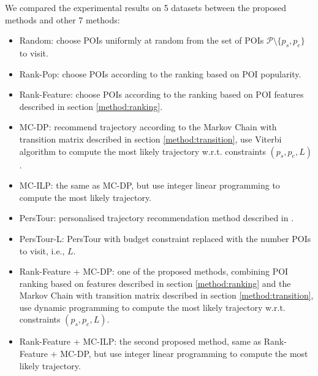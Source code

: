 \documentclass{sig-alternate-05-2015}
\begin{document}
We compared the experimental results on 5 datasets between the proposed methods and other 7 methods:
\begin{itemize}
\item Random: choose POIs uniformly at random from the set of POIs $\mathcal{P} \setminus \{p_s, p_e \}$ to visit.
\item Rank-Pop: choose POIs according to the ranking based on POI popularity.
\item Rank-Feature: choose POIs according to the ranking based on POI features described in section \ref{method:ranking}.
\item MC-DP: recommend trajectory according to the Markov Chain with transition matrix 
      described in section \ref{method:transition},
      use Viterbi algorithm to compute the most likely trajectory w.r.t. constraints $(p_s, p_e, L)$.
\item MC-ILP: the same as MC-DP, but use integer linear programming to compute the most likely trajectory.
\item PersTour\cite{ijcai15}: personalised trajectory recommendation method described in \cite{ijcai15}.
\item PersTour-L: PersTour\cite{ijcai15} with budget constraint replaced with the number POIs to visit, i.e., $L$.
\item Rank-Feature + MC-DP: one of the proposed methods, combining POI ranking based on features 
      described in section \ref{method:ranking} and the Markov Chain with transition matrix described in section \ref{method:transition},
      use dynamic programming to compute the most likely trajectory w.r.t. constraints $(p_s, p_e, L)$.
\item Rank-Feature + MC-ILP: the second proposed method, same as Rank-Feature + MC-DP, 
      but use integer linear programming to compute the most likely trajectory.
\end{itemize}





\end{document}
